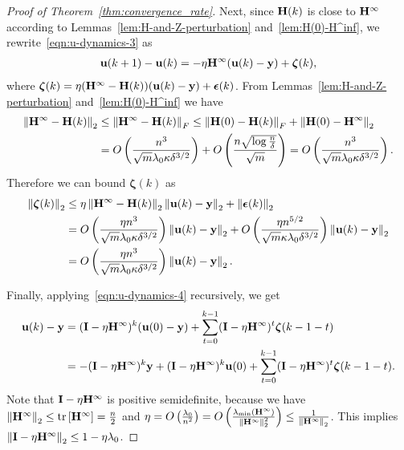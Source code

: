 \begin{proof}[Proof of Theorem~\ref{thm:convergence_rate}]
	Next, since $\mathbf{H}(k)$ is close to $\mathbf{H}^\infty$ according to Lemmas~\ref{lem:H-and-Z-perturbation} and~\ref{lem:H(0)-H^inf}, we rewrite~\eqref{eqn:u-dynamics-3} as
	\begin{equation} \label{eqn:u-dynamics-4}
	\begin{aligned}
	\mathbf{u}(k+1) - \mathbf{u}(k) = - \eta \mathbf{H}^\infty (\mathbf{u}(k) - \mathbf{y}) + \bm{\zeta}(k),
	\end{aligned}
	\end{equation}
	where $\bm{\zeta}(k) = \eta (\mathbf{H}^\infty - \mathbf{H}(k)) (\mathbf{u}(k) - \mathbf{y}) + \bm{\epsilon}(k)$.
	From Lemmas~\ref{lem:H-and-Z-perturbation} and~\ref{lem:H(0)-H^inf} we have
	\begin{equation*}
	\begin{aligned}
	\left\|\mathbf{H}^\infty - \mathbf{H}(k)\right\|_2
	&\le \left\|\mathbf{H}^\infty - \mathbf{H}(k)\right\|_F
	 \le \left\|\mathbf{H}(0) - \mathbf{H}(k)\right\|_F + \left\|\mathbf{H}(0) - \mathbf{H}^\infty\right\|_2  \\
	 &= O\left( \frac{n^3}{\sqrt m \lambda_0 \kappa \delta^{3/2}} \right) + O\left( \frac{n\sqrt{\log \frac{n}{\delta}}}{\sqrt m} \right)
	 = O\left( \frac{n^3}{\sqrt m \lambda_0 \kappa \delta^{3/2}} \right).
	 \end{aligned}
	\end{equation*}
	Therefore we can bound $\bm{\zeta}(k)$ as
	\begin{equation} \label{eqn:u-dynamics-perturbation-2}
	\begin{aligned}
	\left\|\bm{\zeta}(k)\right\|_2
	&\le \eta \left\|\mathbf{H}^\infty - \mathbf{H}(k)\right\|_2 \left\|\mathbf{u}(k) - \mathbf{y}\right\|_2 + \left\|\bm{\epsilon}(k)\right\|_2 \\
	&= O\left(  \frac{\eta n^3}{\sqrt m \lambda_0 \kappa \delta^{3/2}} \right) \left\|\mathbf{u}(k) - \mathbf{y}\right\|_2  + O\left( \frac{\eta  n^{5/2} }{\sqrt m \kappa \lambda_0 \delta^{3/2}} \right)  \left\|\mathbf{u}(k) - \mathbf{y}\right\|_2 \\
	&= O\left(  \frac{\eta n^3}{\sqrt m \lambda_0 \kappa \delta^{3/2}} \right) \left\|\mathbf{u}(k) - \mathbf{y}\right\|_2  .
	\end{aligned}
	\end{equation}
	
	Finally, applying~\eqref{eqn:u-dynamics-4} recursively, we get
	\begin{equation} \label{eqn:u-expression}
	\begin{aligned}
	\mathbf{u}(k) - \mathbf{y} &= (\mathbf{I} - \eta \mathbf{H}^\infty)^k (\mathbf{u}(0) - \mathbf{y}) + \sum_{t=0}^{k-1} (\mathbf{I} - \eta \mathbf{H}^\infty)^t \bm{\zeta}(k-1-t) \\
	&= -(\mathbf{I} - \eta \mathbf{H}^\infty)^k \mathbf{y} + (\mathbf{I} - \eta \mathbf{H}^\infty)^k \mathbf{u}(0)  + \sum_{t=0}^{k-1} (\mathbf{I} - \eta \mathbf{H}^\infty)^t \bm{\zeta}(k-1-t).
	\end{aligned}
	\end{equation}
	Note that $\mathbf{I} - \eta \mathbf{H}^\infty$ is positive semidefinite, because we have $\left\|\mathbf{H}^\infty\right\|_2 \le \mathrm{tr}\left[\mathbf{H}^\infty\right] = \frac n2$ and $\eta = O\left( \frac{\lambda_0}{n^2} \right) = O\left( \frac{\lambda_{\min}(\mathbf{H}^\infty)}{\left\|\mathbf{H}^\infty\right\|_2^2} \right) \le \frac{1}{\left\|\mathbf{H}^\infty\right\|_2}$.
	This implies $\left\|\mathbf{I} - \eta \mathbf{H}^\infty\right\|_2 \le 1 - \eta \lambda_0$.
		

\end{proof}
